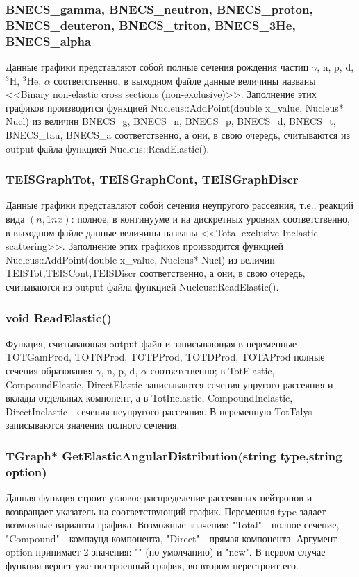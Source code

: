 \documentclass[a4paper,12pt]{extarticle}
\begin{document}
\subsubsection{BNECS_gamma, BNECS_neutron, BNECS_proton, BNECS_deuteron, BNECS_triton, BNECS_3He, BNECS_alpha}
Данные графики представляют собой полные сечения рождения частиц $\gamma$, n, p, d, $^3$H, $^3$He, $\alpha$ соответственно, в выходном файле данные величины названы <<Binary non-elastic cross sections (non-exclusive)>>. Заполнение этих графиков производится функцией Nucleus::AddPoint(double x_value, Nucleus* Nucl) из величин BNECS_g, BNECS_n, BNECS_p, BNECS_d, BNECS_t, BNECS_tau, BNECS_a соответственно, а они, в свою очередь, считываются из output файла функцией Nucleus::ReadElastic().
\subsubsection{TEISGraphTot, TEISGraphCont, TEISGraphDiscr}
Данные графики представляют собой сечения неупругого рассеяния, т.е., реакций вида $(n,1nx)$: полное, в континууме и на дискретных уровнях соответственно, в выходном файле данные величины названы <<Total exclusive Inelastic scattering>>. Заполнение этих графиков производится функцией Nucleus::AddPoint(double x_value, Nucleus* Nucl) из величин TEISTot,TEISCont,TEISDiscr соответственно, а они, в свою очередь, считываются из output файла функцией Nucleus::ReadElastic().
\subsubsection{void ReadElastic()}
Функция, считывающая output файл и записывающая в переменные TOTGamProd, TOTNProd, TOTPProd, TOTDProd, TOTAProd полные сечения образования $\gamma$, n, p, d, $\alpha$ соответственно;  в TotElastic, CompoundElastic, DirectElastic записываются сечения упругого рассеяния и вклады отдельных компонент, а в TotInelastic, CompoundInelastic, DirectInelastic - сечения неупругого рассеяния. В переменную TotTalys записываются значения полного сечения.
\subsubsection{TGraph* GetElasticAngularDistribution(string type,string option)}
Данная функция строит угловое распределение рассеянных нейтронов и возвращает указатель на соответствующий график. Переменная type задает возможные варианты графика. Возможные значения: "Total" - полное сечение, "Compound" - компаунд-компонента, "Direct" - прямая компонента. Аргумент option принимает 2 значения: "" (по-умолчанию) и "new". В первом случае функция вернет уже построенный график, во втором-перестроит его.
\end{document}
